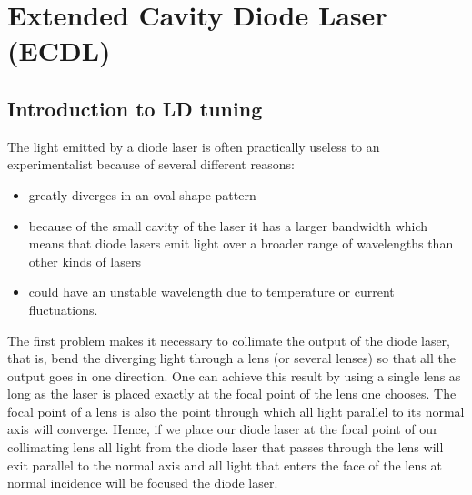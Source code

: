 \chapter{Extended Cavity Diode Laser (ECDL)}\label{ECDL}
	\section{Introduction to LD tuning}

The light emitted by a diode laser is often practically useless to an experimentalist because of several different reasons:
\begin{itemize}
 \item greatly diverges in an oval shape pattern
 \item because of the small cavity of the laser it has a larger bandwidth which means that diode lasers emit light over a broader range of wavelengths than other kinds of lasers
 \item could have an unstable wavelength due to temperature or current fluctuations.
\end{itemize}

The first problem makes it necessary to collimate the output of the diode laser, that is, bend the diverging light through a lens (or several lenses) so that all the output goes in one direction. One can achieve this result by using a single lens as long as the laser is placed exactly at the focal  point of the lens one chooses. The focal point of a lens is also the point through which all light parallel to its normal axis will converge. Hence, if we place our diode laser at the focal point of our collimating lens all light from the diode laser that passes through the lens will exit parallel to the normal axis and all light that enters the face of the lens at normal incidence will be focused the diode laser.

